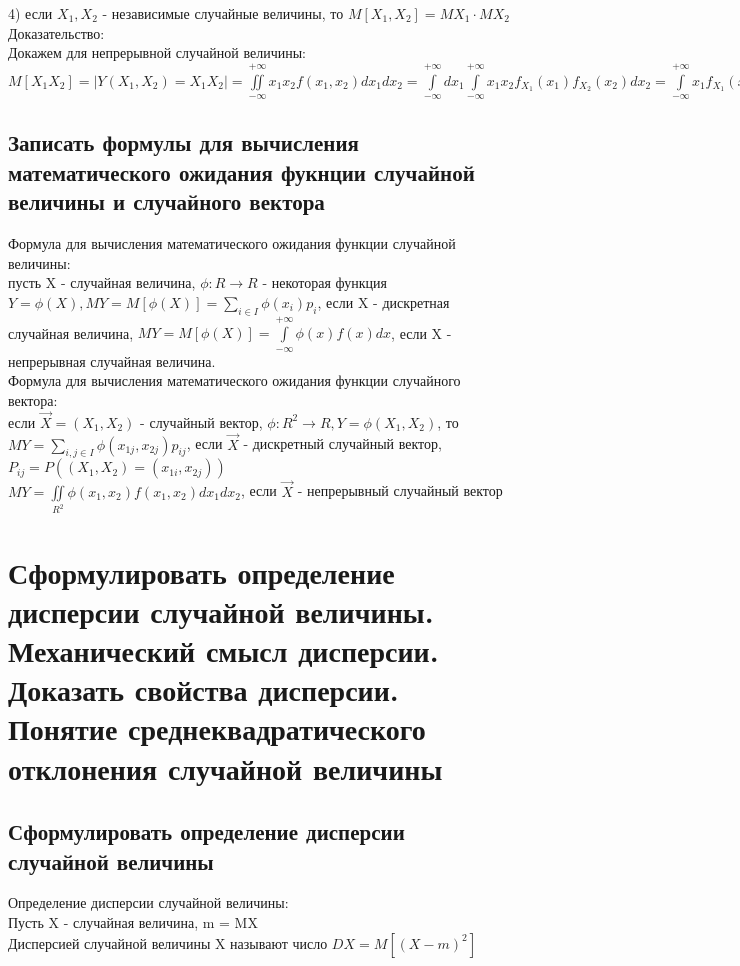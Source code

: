 4) если $X_{1},  X_{2}$ - независимые случайные величины, то $M[X_{1}, X_{2}] = MX_{1} \cdot MX_{2}$
Доказательство:\\
Докажем для непрерывной случайной величины:\\
$M[X_{1} X_{2}] = |Y(X_{1}, X_{2}) = X_{1} X_{2}| = \iint\limits_{-\infty}^{+\infty} x_{1} x_{2} f(x_{1}, x_{2}) dx_{1} dx_{2} = \int\limits_{-\infty}^{+\infty} dx_{1} \int\limits_{-\infty}^{+\infty} x_{1} x_{2} f_{X_{1}}(x_{1}) f_{X_{2}}(x_{2}) dx_{2} = \int\limits_{-\infty}^{+\infty} x_{1} f_{X_{1}} (x_{1}) dx_{1} \int\limits_{-\infty}^{+\infty} x_{2} f_{X_{2}}(x_{2}) dx_{2} = M[X_{1}]M[X_{2}]$\\

\subsection{Записать формулы для вычисления математического ожидания фукнции случайной величины и случайного вектора}
Формула для вычисления математического ожидания функции случайной величины:\\
пусть X - случайная величина, $\phi : R \rightarrow R$ - некоторая функция $Y = \phi(X), MY = M[\phi(X)] = \sum\limits_{i \in I} \phi(x_{i})p_{i}$, если X - дискретная случайная величина, $MY = M[\phi(X)] = \int\limits_{-\infty}^{+\infty} \phi(x) f(x) dx$, если X - непрерывная случайная величина.\\

Формула для вычисления математического ожидания функции случайного вектора:\\
если $\overrightarrow{X} = (X_{1}, X_{2})$ - случайный вектор, $\phi : R^{2} \rightarrow R, Y = \phi(X_{1}, X_{2})$, то\\
$MY = \sum\limits_{i,j \in I} \phi(x_{1j}, x_{2j}) p_{ij}$, если $\overrightarrow{X}$ - дискретный случайный вектор, $P_{ij} = P((X_{1}, X_{2}) = (x_{1i}, x_{2j}))$\\
$MY = \iint\limits_{R^{2}} \phi(x_{1}, x_{2}) f(x_{1}, x_{2}) dx_{1} dx_{2}$, если $\overrightarrow{X}$ - непрерывный случайный вектор\\

\section{Сформулировать определение дисперсии случайной величины. Механический смысл дисперсии. Доказать свойства дисперсии. Понятие среднеквадратического отклонения случайной величины}
\subsection{Сформулировать определение дисперсии случайной величины}
Определение дисперсии случайной величины:\\
Пусть X - случайная величина, m = MX\\
Дисперсией случайной величины X называют число $DX = M[(X - m)^{2}]$\\
